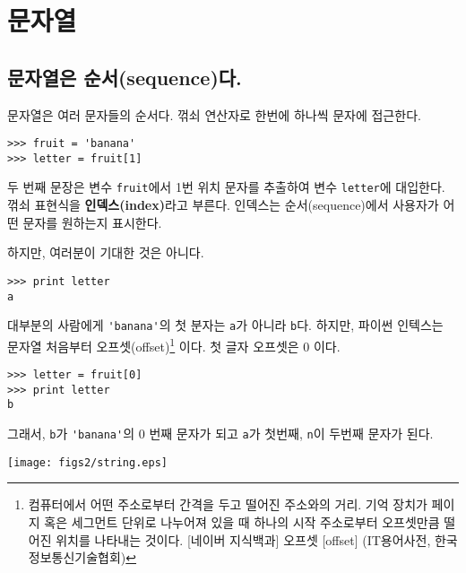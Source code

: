 
\chapter{문자열}
\label{strings}


\section{    문자열은 순서(sequence)다.}

문자열은 여러 문자들의 순서다. 
꺾쇠 연산자로 한번에 하나씩 문자에 접근한다.

\beforeverb
\begin{verbatim}
>>> fruit = 'banana'
>>> letter = fruit[1]
\end{verbatim}
\afterverb
%

두 번째 문장은 변수 {\tt fruit}에서 1번 위치 문자를 추출하여 변수 {\tt letter}에 대입한다.
꺾쇠 표현식을 {\bf 인덱스(index)}라고 부른다. 
인덱스는 순서(sequence)에서 사용자가 어떤 문자를 원하는지 표시한다.

하지만, 여러분이 기대한 것은 아니다.

\beforeverb
\begin{verbatim}
>>> print letter
a
\end{verbatim}
\afterverb
%

대부분의 사람에게 \verb"'banana'"의 첫 분자는 {\tt a}가 아니라 {\tt b}다.
하지만, 파이썬 인텍스는 문자열 처음부터 오프셋(offset)\footnote{컴퓨터에서 어떤 주소로부터 간격을 두고 떨어진 주소와의 거리. 기억 장치가 페이지 혹은 세그먼트 단위로 나누어져 있을 때 하나의 시작 주소로부터 오프셋만큼 떨어진 위치를 나타내는 것이다. [네이버 지식백과] 오프셋 [offset] (IT용어사전, 한국정보통신기술협회)} 이다. 
첫 글자 오프셋은 0 이다.

\beforeverb
\begin{verbatim}
>>> letter = fruit[0]
>>> print letter
b
\end{verbatim}
\afterverb
%

그래서, {\tt b}가 \verb"'banana'"의 0 번째 문자가 되고 {\tt a}가 첫번째, {\tt n}이 두번째 문자가 된다.

\beforefig
\centerline{\texttt{[image: figs2/string.eps]}}
\afterfig

